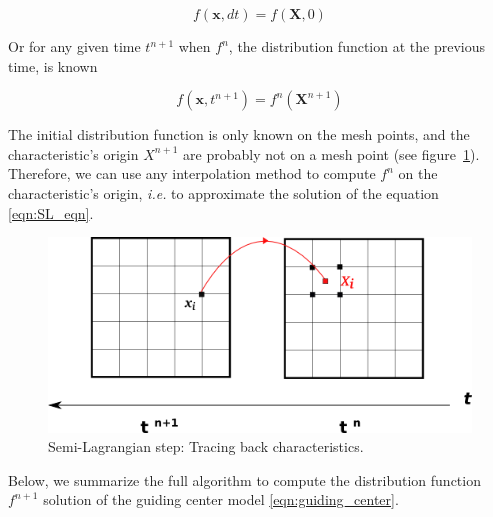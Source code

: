 \documentclass[proc]{edpsmath}
\begin{document}
\begin{equation}
	f(\mathbf{x}, dt) = f(\mathbf{X}, 0)
\end{equation}

Or for any given time $t^{n+1}$ when $f^n$, the distribution function at the previous time, is known

\begin{equation}
\label{eqn:SL_eqn}
	f(\mathbf{x}, t^{n+1}) = f^n(\mathbf{X}^{n+1})
\end{equation}

The initial distribution function is only known on the mesh points, and the characteristic's origin $X^{n+1}$ are probably not on a mesh point (see figure~\ref{fig:SL}). Therefore, we can use any interpolation method to compute $f^n$ on the characteristic's origin, \emph{i.e.} to approximate the solution of the equation \eqref{eqn:SL_eqn}.

\begin{figure}[h!]
	\label{fig:SL}
	\centering
	\includegraphics[scale=0.5]{figures/SL.png} 
	\caption{Semi-Lagrangian step: Tracing back characteristics.}
\end{figure}

Below, we summarize the full algorithm to compute the distribution function $f^{n+1}$ solution of the guiding center model \eqref{eqn:guiding_center}.
\end{document}
